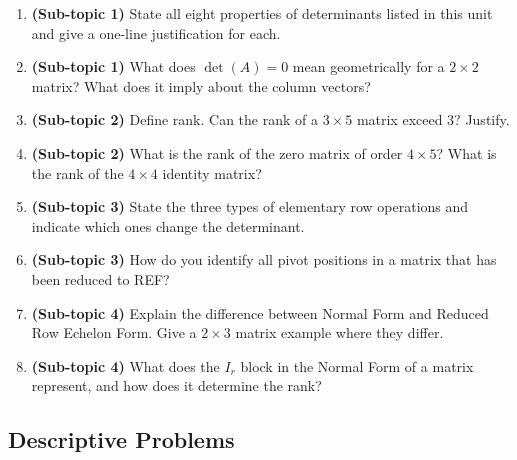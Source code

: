 \documentclass[12pt,a4paper]{article}
\begin{document}
\begin{enumerate}[label=\textbf{V\arabic*.}]
  \item \textbf{(Sub-topic 1)} State all eight properties of determinants listed in this unit and give a one-line justification for each.
  \item \textbf{(Sub-topic 1)} What does $\det(A) = 0$ mean geometrically for a $2\times2$ matrix? What does it imply about the column vectors?
  \item \textbf{(Sub-topic 2)} Define rank. Can the rank of a $3\times5$ matrix exceed 3? Justify.
  \item \textbf{(Sub-topic 2)} What is the rank of the zero matrix of order $4\times5$? What is the rank of the $4\times4$ identity matrix?
  \item \textbf{(Sub-topic 3)} State the three types of elementary row operations and indicate which ones change the determinant.
  \item \textbf{(Sub-topic 3)} How do you identify all pivot positions in a matrix that has been reduced to REF?
  \item \textbf{(Sub-topic 4)} Explain the difference between Normal Form and Reduced Row Echelon Form. Give a $2\times3$ matrix example where they differ.
  \item \textbf{(Sub-topic 4)} What does the $I_r$ block in the Normal Form of a matrix represent, and how does it determine the rank?
\end{enumerate}

\subsection*{Descriptive Problems}
\end{document}
